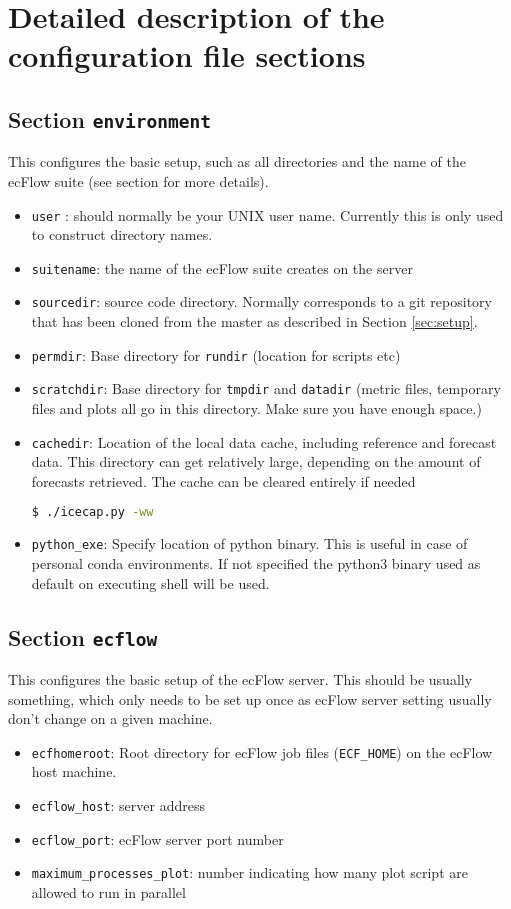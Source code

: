 \documentclass[DIV=10, parskip=full]{scrreprt}
\begin{document}
\section{Detailed description of the configuration file sections}

\subsection{Section \texttt{environment}} \label{sec:environment}
This configures the basic setup, such as all directories and the name of the ecFlow suite (see section \label{sec:eflow} for more details).
\begin{itemize}
	\item \texttt{user} : should normally be your UNIX user name. Currently this is only used to construct directory names.
	\item \texttt{suitename}: the name of the ecFlow suite creates on the server 
	\item \texttt{sourcedir}: source code directory. Normally corresponds to a git repository that has been cloned from the master as described in Section \ref{sec:setup}.
	\item \texttt{permdir}: Base directory for \texttt{rundir} (location for scripts etc) 
	\item \texttt{scratchdir}: Base directory for \texttt{tmpdir} and  \texttt{datadir} (metric files, temporary files and plots all go in this directory. Make sure you have enough space.) 
	   \item \texttt{cachedir}: Location of the local data cache, including reference and forecast data. This directory can get relatively large, depending on the amount of forecasts retrieved. The cache can be cleared entirely if needed 
	   \begin{lstlisting}[language=bash]
	   	$ ./icecap.py -ww
	   \end{lstlisting}
	   \item \texttt{python\_exe}: Specify location of python binary. This is useful in case of personal conda environments. If not specified the python3 binary used as default on executing shell will be used.
\end{itemize}
	
\subsection{Section \texttt{ecflow}} \label{sec:ecflow}
This configures the basic setup of the ecFlow server. This should be usually something, which only needs to be set up once as ecFlow server setting usually don't change on a given machine.
\begin{itemize}
 	\item \texttt{ecfhomeroot}: Root directory for ecFlow job files (\texttt{ECF\_HOME}) on the ecFlow host machine.
 	\item \texttt{ecflow\_host}: server address
 	\item \texttt{ecflow\_port}: ecFlow server port number
 	\item \texttt{maximum\_processes\_plot}: number indicating how many plot script are allowed to run in parallel
 \end{itemize}
 
\end{document}
